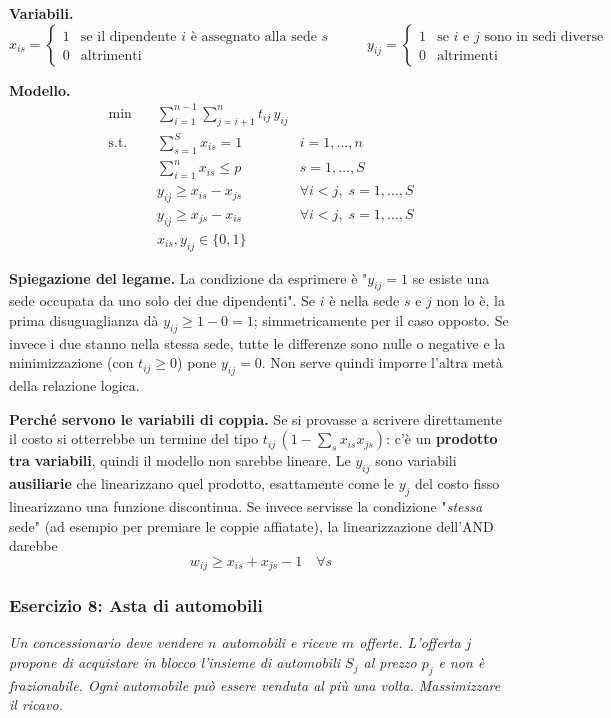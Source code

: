 \documentclass[12pt]{extarticle} %
\begin{document}
\noindent\textbf{Variabili.}
\[
x_{is} = \begin{cases} 1 & \text{se il dipendente } i \text{ è assegnato alla sede } s\\ 0 & \text{altrimenti}\end{cases}
\hspace{1cm}
y_{ij} = \begin{cases} 1 & \text{se } i \text{ e } j \text{ sono in sedi diverse}\\ 0 & \text{altrimenti}\end{cases}
\]

\noindent\textbf{Modello.}
\[
\begin{aligned}
\min \quad & \sum_{i=1}^{n-1}\sum_{j=i+1}^{n} t_{ij}\, y_{ij} \\
\text{s.t.} \quad & \sum_{s=1}^{S} x_{is} = 1 & i=1,\dots,n \\
& \sum_{i=1}^n x_{is} \le p & s=1,\dots,S \\
& y_{ij} \ge x_{is} - x_{js} & \forall i<j, \; s=1,\dots,S \\
& y_{ij} \ge x_{js} - x_{is} & \forall i<j, \; s=1,\dots,S \\
& x_{is}, y_{ij} \in \{0,1\}
\end{aligned}
\]

\noindent\textbf{Spiegazione del legame.} La condizione da esprimere è "$y_{ij}=1$ se esiste una sede occupata da uno solo dei due dipendenti". Se $i$ è nella sede $s$ e $j$ non lo è, la prima disuguaglianza dà $y_{ij}\ge 1-0=1$; simmetricamente per il caso opposto. Se invece i due stanno nella stessa sede, tutte le differenze sono nulle o negative e la minimizzazione (con $t_{ij}\ge0$) pone $y_{ij}=0$. Non serve quindi imporre l'altra metà della relazione logica.

\noindent\textbf{Perché servono le variabili di coppia.} Se si provasse a scrivere direttamente il costo si otterrebbe un termine del tipo $t_{ij}\,(1 - \sum_s x_{is}x_{js})$: c'è un \textbf{prodotto tra variabili}, quindi il modello non sarebbe lineare. Le $y_{ij}$ sono variabili \textbf{ausiliarie} che linearizzano quel prodotto, esattamente come le $y_j$ del costo fisso linearizzano una funzione discontinua. Se invece servisse la condizione "\textit{stessa} sede" (ad esempio per premiare le coppie affiatate), la linearizzazione dell'AND darebbe
\[
w_{ij} \ge x_{is} + x_{js} - 1 \quad \forall s
\]

\subsubsection{Esercizio 8: Asta di automobili}
\textit{Un concessionario deve vendere $n$ automobili e riceve $m$ offerte. L'offerta $j$ propone di acquistare in blocco l'insieme di automobili $S_j$ al prezzo $p_j$ e non è frazionabile. Ogni automobile può essere venduta al più una volta. Massimizzare il ricavo.}\\
\end{document}
